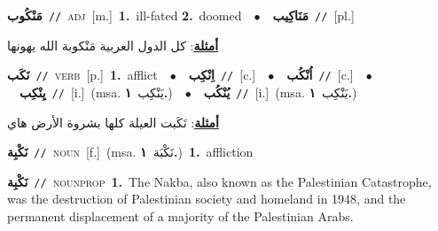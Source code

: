 \documentclass[10pt,a4paper,twoside]{article} %
\begin{document}
\begin{multicols}{2}
{\setlength\topsep{0pt}\textbf{\foreignlanguage{arabic}{مَنْكُوب}}\ {\color{gray}\texttt{//}\color{black}}\ \textsc{adj}\ [m.]\ \textbf{1.}~ill-fated  \textbf{2.}~doomed\ \ $\bullet$\ \ \setlength\topsep{0pt}\textbf{\foreignlanguage{arabic}{مَنَاكِيب}}\ {\color{gray}\texttt{//}\color{black}}\ [pl.]\  \begin{flushright}\color{gray}\foreignlanguage{arabic}{\textbf{\underline{\foreignlanguage{arabic}{أمثلة}}}: كل الدول العربية مَنْكوبة الله يهونها}\end{flushright}\color{black}} \vspace{2mm}

{\setlength\topsep{0pt}\textbf{\foreignlanguage{arabic}{نَكَب}}\ {\color{gray}\texttt{//}\color{black}}\ \textsc{verb}\ [p.]\ \textbf{1.}~afflict\ \ $\bullet$\ \ \setlength\topsep{0pt}\textbf{\foreignlanguage{arabic}{اِنْكِب}}\ {\color{gray}\texttt{//}\color{black}}\ [c.]\ \ $\bullet$\ \ \setlength\topsep{0pt}\textbf{\foreignlanguage{arabic}{اُنْكُب}}\ {\color{gray}\texttt{//}\color{black}}\ [c.]\ \ $\bullet$\ \ \setlength\topsep{0pt}\textbf{\foreignlanguage{arabic}{يِنْكِب}}\ {\color{gray}\texttt{//}\color{black}}\ [i.]\ \color{gray}(msa. \foreignlanguage{arabic}{يَنْكِب}~\foreignlanguage{arabic}{\textbf{١.}})\color{black}\ \ $\bullet$\ \ \setlength\topsep{0pt}\textbf{\foreignlanguage{arabic}{يُنْكُب}}\ {\color{gray}\texttt{//}\color{black}}\ [i.]\ \color{gray}(msa. \foreignlanguage{arabic}{يَنْكِب}~\foreignlanguage{arabic}{\textbf{١.}})\color{black}\  \begin{flushright}\color{gray}\foreignlanguage{arabic}{\textbf{\underline{\foreignlanguage{arabic}{أمثلة}}}: نَكَبت العيلة كلها بشروة الأرض هاي}\end{flushright}\color{black}} \vspace{2mm}

{\setlength\topsep{0pt}\textbf{\foreignlanguage{arabic}{نَكْبِة}}\ {\color{gray}\texttt{//}\color{black}}\ \textsc{noun}\ [f.]\ \color{gray}(msa. \foreignlanguage{arabic}{نَكْبَة}~\foreignlanguage{arabic}{\textbf{١.}})\color{black}\ \textbf{1.}~affliction\ } \vspace{2mm}

{\setlength\topsep{0pt}\textbf{\foreignlanguage{arabic}{نَكْبِة}}\ {\color{gray}\texttt{//}\color{black}}\ \textsc{noun\textunderscore prop}\ \textbf{1.}~The Nakba, also known as the Palestinian Catastrophe, was the destruction of Palestinian society and homeland in 1948, and the permanent displacement of a majority of the Palestinian Arabs.\ } \vspace{2mm}


\end{multicols}
\end{document}
